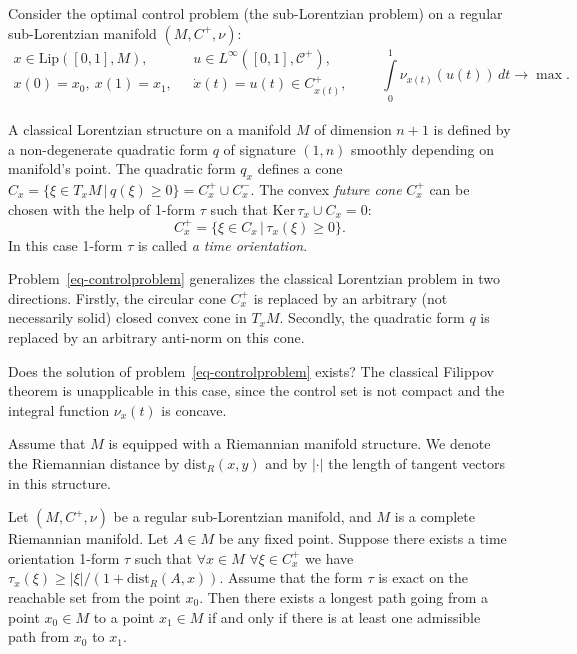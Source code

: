 \documentclass[12pt]{llncs}
\begin{document}
Consider the optimal control problem (the sub-Lorentzian problem) on a regular sub-Lorentzian manifold $(M, C^+, \nu)$:
\begin{equation}
\label{eq-controlproblem}
\begin{array}{ll}
x \in \mathrm{Lip}{([0,1], M)}, & u \in L^\infty{([0,1], \mathcal{C}^+)},\\
x(0) = x_0, \ x(1) = x_1, \ \ \ & \dot{x}(t) = u(t) \in C_{x(t)}^+,\\
\end{array}
\qquad
\int\limits_0^1{\nu_{x(t)}(u(t)) \, dt} \rightarrow \max.
\end{equation}

A classical Lorentzian structure on a manifold $M$ of dimension $n+1$ is defined by a non-degenerate quadratic form $q$ of signature $(1,n)$ smoothly depending on manifold's point. The quadratic form $q_x$ defines a cone $C_x =\{\xi \in T_xM \, | \, q(\xi) \geq 0\} = C_x^+ \cup C_x^-$. 
The convex \emph{future cone} $C_x^+$ can be chosen with the help of 1-form $\tau$ such that $\mathrm{Ker}\,\tau_x \cup C_x = 0$:
$$
C_x^+ = \{\xi \in C_x \, | \, \tau_x(\xi) \geq 0\}.
$$
In this case 1-form $\tau$ is called \emph{a time orientation}.

Problem~\eqref{eq-controlproblem} generalizes the classical Lorentzian problem in two directions.
Firstly, the circular cone $C^+_x$ is replaced by an arbitrary (not necessarily solid) closed convex cone in $T_xM$.
Secondly, the quadratic form $q$ is replaced by an arbitrary anti-norm on this cone.

Does the solution of problem~\eqref{eq-controlproblem} exists?
The classical Filippov theorem is unapplicable in this case,
since the control set is not compact and the integral function $\nu_x(t)$ is concave.

Assume that $M$ is equipped with a Riemannian manifold structure.
We denote the Riemannian distance by $\mathrm{dist}_R(x, y)$ and by $|\cdot|$ the length of tangent vectors in this structure.

\begin{theorem}
\label{th-exist}
Let $(M,C^+,\nu)$ be a regular sub-Lorentzian manifold, and $M$ is a complete Riemannian manifold.
Let $A \in M$ be any fixed point. Suppose there exists a time orientation 1-form $\tau$ such that
$\forall x\in M$ $\forall \xi\in C^+_x$ we have $\tau_x(\xi)\ge |\xi|/(1+\mathrm{dist}_R(A,x))$.
Assume that the form $\tau$ is exact on the reachable set from the point $x_0$.
Then there exists a longest path going from a point $x_0 \in M$ to a point $x_1 \in M$ if and only if there is at least one admissible path from $x_0$ to $x_1$.
\end{theorem}
\end{document}
